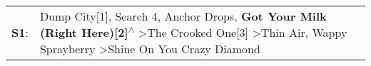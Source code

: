 \begin{supertabular}{p{0.03\textwidth}p{0.92\textwidth}}
 \textbf{S1}:  &  Dump City[1]\textsuperscript{}, \enspace Search 4\textsuperscript{}, \enspace Anchor Drops\textsuperscript{}, \enspace \textbf{Got Your Milk (Right Here)[2]\textsuperscript{$\wedge$}} \textgreater \enspace The Crooked One[3]\textsuperscript{} \textgreater \enspace Thin Air\textsuperscript{}, \enspace Wappy Sprayberry\textsuperscript{} \textgreater \enspace Shine On You Crazy Diamond\textsuperscript{}  \enspace  \\
\end{supertabular}
